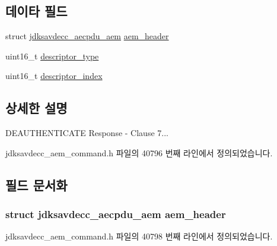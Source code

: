 \subsection*{데이타 필드}
\begin{DoxyCompactItemize}
\item 
struct \hyperlink{structjdksavdecc__aecpdu__aem}{jdksavdecc\+\_\+aecpdu\+\_\+aem} \hyperlink{structjdksavdecc__aem__command__deauthenticate__response_ae1e77ccb75ff5021ad923221eab38294}{aem\+\_\+header}
\item 
uint16\+\_\+t \hyperlink{structjdksavdecc__aem__command__deauthenticate__response_ab7c32b6c7131c13d4ea3b7ee2f09b78d}{descriptor\+\_\+type}
\item 
uint16\+\_\+t \hyperlink{structjdksavdecc__aem__command__deauthenticate__response_a042bbc76d835b82d27c1932431ee38d4}{descriptor\+\_\+index}
\end{DoxyCompactItemize}


\subsection{상세한 설명}
D\+E\+A\+U\+T\+H\+E\+N\+T\+I\+C\+A\+TE Response -\/ Clause 7... 

jdksavdecc\+\_\+aem\+\_\+command.\+h 파일의 40796 번째 라인에서 정의되었습니다.



\subsection{필드 문서화}
\subsubsection[{\texorpdfstring{aem\+\_\+header}{aem_header}}]{\setlength{\rightskip}{0pt plus 5cm}struct {\bf jdksavdecc\+\_\+aecpdu\+\_\+aem} aem\+\_\+header}\hypertarget{structjdksavdecc__aem__command__deauthenticate__response_ae1e77ccb75ff5021ad923221eab38294}{}\label{structjdksavdecc__aem__command__deauthenticate__response_ae1e77ccb75ff5021ad923221eab38294}


jdksavdecc\+\_\+aem\+\_\+command.\+h 파일의 40798 번째 라인에서 정의되었습니다.

